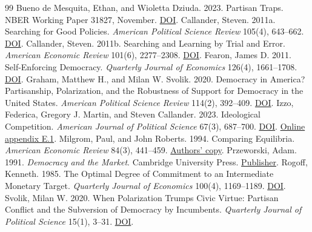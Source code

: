 \FloatBarrier
\begin{thebibliography}{99}\small\linespread{1.0}\selectfont
{} Bueno de Mesquita, Ethan, and Wioletta Dziuda. 2023. Partisan Traps. NBER Working Paper 31827, November. \href{https://doi.org/10.3386/w31827}{DOI}.
 Callander, Steven. 2011a. Searching for Good Policies. \emph{American Political Science Review} 105(4), 643--662. \href{https://doi.org/10.1017/S0003055411000426}{DOI}.
 Callander, Steven. 2011b. Searching and Learning by Trial and Error. \emph{American Economic Review} 101(6), 2277--2308. \href{https://doi.org/10.1257/aer.101.6.2277}{DOI}.
 Fearon, James D. 2011. Self-Enforcing Democracy. \emph{Quarterly Journal of Economics} 126(4), 1661--1708. \href{https://doi.org/10.1093/qje/qjr038}{DOI}.
 Graham, Matthew H., and Milan W. Svolik. 2020. Democracy in America? Partisanship, Polarization, and the Robustness of Support for Democracy in the United States. \emph{American Political Science Review} 114(2), 392--409. \href{https://doi.org/10.1017/S0003055420000052}{DOI}.
 Izzo, Federica, Gregory J. Martin, and Steven Callander. 2023. Ideological Competition. \emph{American Journal of Political Science} 67(3), 687--700. \href{https://doi.org/10.1111/ajps.12763}{DOI}. \href{https://www.federicaizzo.com/pdf/Ideological_Competition_FINAL_Website.pdf\#page=44}{Online appendix E.1}.
 Milgrom, Paul, and John Roberts. 1994. Comparing Equilibria. \emph{American Economic Review} 84(3), 441--459. \href{https://web.stanford.edu/~milgrom/publishedarticles/Comparing\%20Equilibria.pdf}{Authors' copy}.
 Przeworski, Adam. 1991. \emph{Democracy and the Market}. Cambridge University Press. \href{https://www.cambridge.org/core/books/abs/democracy-and-the-market/democracy/0AA4BF19C5129B8634C501C22B5FB61B}{Publisher}.
 Rogoff, Kenneth. 1985. The Optimal Degree of Commitment to an Intermediate Monetary Target. \emph{Quarterly Journal of Economics} 100(4), 1169--1189. \href{https://doi.org/10.2307/1885679}{DOI}.
 Svolik, Milan W. 2020. When Polarization Trumps Civic Virtue: Partisan Conflict and the Subversion of Democracy by Incumbents. \emph{Quarterly Journal of Political Science} 15(1), 3--31. \href{https://doi.org/10.1561/100.00018132}{DOI}.
\end{thebibliography}

